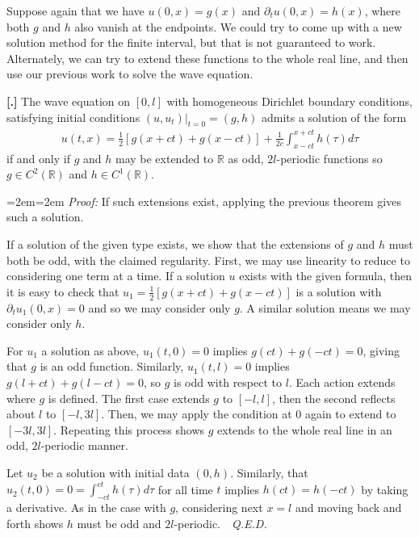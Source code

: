 \documentclass{article}
\newcommand{\R}{{\mathbb{R}}}
\newcommand{\pd}{\partial}
\newcounter{result}[section]
\newenvironment{res}[1][]{\refstepcounter{result}\par\medskip
	\noindent \textbf{[\thesection.\theresult] #1} \rmfamily}{\medskip}
\newenvironment{pf}{%
	\par%
	\medskip
	\leftskip=2em\rightskip=2em%
	\noindent\ignorespaces \textit{Proof:} \newline}{%
	\,\, \newline \textit{Q.E.D.}\par\medskip}
\begin{document}
	Suppose again that we have $u(0,x) = g(x)$ and $\pd_{t}u(0,x) = h(x)$, where both $g$ and $h$ also vanish at the endpoints. We could try to come up with a new solution method for the finite interval, but that is not guaranteed to work. Alternately, we can try to extend these functions to the whole real line, and then use our previous work to solve the wave equation. 
	
	\begin{res}
		The wave equation on $[0,l]$ with homogeneous Dirichlet boundary conditions, satisfying initial conditions $(u,u_t)|_{t = 0} = (g,h)$ admits a solution of the form 
		\begin{align*}
			u(t,x) = \frac{1}{2}\left[g(x+ct)+g(x-ct)  \right] + \frac{1}{2c} \int_{x-ct}^{x+ct} h(\tau) d\tau
		\end{align*}
		if and only if $g$ and $h$ may be extended to $\R$ as odd, $2l$-periodic functions so $g \in C^{2}(\R)$ and $h \in C^{1}(\R)$. 
	\end{res}
	\begin{pf}
		If such extensions exist, applying the previous theorem gives such a solution.
		
		If a solution of the given type exists, we show that the extensions of $g$ and $h$ must both be odd, with the claimed regularity. First, we may use linearity to reduce to considering one term at a time. If a solution $u$ exists with the given formula, then it is easy to check that $u_1 = \frac{1}{2}\left[g(x+ct)+g(x-ct)  \right]$ is a solution with $\pd_{t} u_1(0,x) = 0$ and so we may consider only $g$. A similar solution means we may consider only $h$. 
		
		
		For $u_1$ a solution as above, $u_1(t,0) = 0$ implies $g(ct) + g(-ct) = 0$, giving that $g$ is an odd function. Similarly, $u_1(t,l) = 0$ implies $g(l+ct) + g(l-ct) = 0$, so $g$ is odd with respect to $l$. Each action extends where $g$ is defined. The first case extends $g$ to $[-l,l]$, then the second reflects about $l$ to $[-l,3l]$. Then, we may apply the condition at $0$ again to extend to $[-3l,3l]$. Repeating this process shows $g$ extends to the whole real line in an odd, $2l$-periodic manner. 
		
		Let $u_2$ be a solution with initial data $(0,h)$. Similarly, that $u_2(t,0) = 0 = \int_{-ct}^{ct}h(\tau) d\tau$ for all time $t$ implies $h(ct) = h(-ct)$ by taking a derivative. As in the case with $g$, considering next $x=l$ and moving back and forth shows $h$ must be odd and $2l$-periodic. 
	\end{pf}
	
\end{document}
